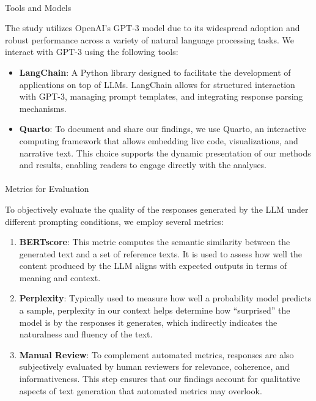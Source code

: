 \documentclass[
]{agujournal2019}
\makeatletter
\let\oldparagraph\paragraph
\renewcommand{\paragraph}{
    \@ifstar
      \xxxParagraphStar
      \xxxParagraphNoStar
  }
\newcommand{\xxxParagraphStar}[1]{\oldparagraph*{#1}\mbox{}}
\newcommand{\xxxParagraphNoStar}[1]{\oldparagraph{#1}\mbox{}}
\makeatother
\begin{document}
\paragraph{Tools and Models}\label{tools-and-models}

The study utilizes OpenAI's GPT-3 model due to its widespread adoption
and robust performance across a variety of natural language processing
tasks. We interact with GPT-3 using the following tools:

\begin{itemize}
\item
  \textbf{LangChain}: A Python library designed to facilitate the
  development of applications on top of LLMs. LangChain allows for
  structured interaction with GPT-3, managing prompt templates, and
  integrating response parsing mechanisms.
\item
  \textbf{Quarto}: To document and share our findings, we use Quarto, an
  interactive computing framework that allows embedding live code,
  visualizations, and narrative text. This choice supports the dynamic
  presentation of our methods and results, enabling readers to engage
  directly with the analyses.
\end{itemize}

\paragraph{Metrics for Evaluation}\label{metrics-for-evaluation}

To objectively evaluate the quality of the responses generated by the
LLM under different prompting conditions, we employ several metrics:

\begin{enumerate}
\def\labelenumi{\arabic{enumi}.}
\item
  \textbf{BERTscore}: This metric computes the semantic similarity
  between the generated text and a set of reference texts. It is used to
  assess how well the content produced by the LLM aligns with expected
  outputs in terms of meaning and context.
\item
  \textbf{Perplexity}: Typically used to measure how well a probability
  model predicts a sample, perplexity in our context helps determine how
  ``surprised'' the model is by the responses it generates, which
  indirectly indicates the naturalness and fluency of the text.
\item
  \textbf{Manual Review}: To complement automated metrics, responses are
  also subjectively evaluated by human reviewers for relevance,
  coherence, and informativeness. This step ensures that our findings
  account for qualitative aspects of text generation that automated
  metrics may overlook.
\end{enumerate}
\end{document}
